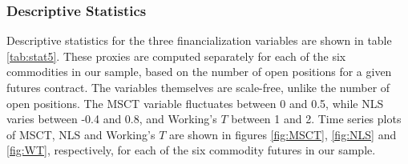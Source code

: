 \subsubsection{Descriptive Statistics}
Descriptive statistics for the three financialization variables are shown in table \ref{tab:stat5}. These proxies are computed separately for each of the six commodities in our sample, based on the number of open positions for a given futures contract. The variables themselves are scale-free, unlike the number of open positions. The MSCT variable fluctuates between 0 and 0.5, while  NLS  varies between -0.4 and 0.8, and  Working's $T$  between 1 and 2. Time series plots of  MSCT, NLS and Working's $T$  are shown in figures \ref{fig:MSCT}, \ref{fig:NLS} and \ref{fig:WT}, respectively, for each of the six commodity futures in our sample. 
